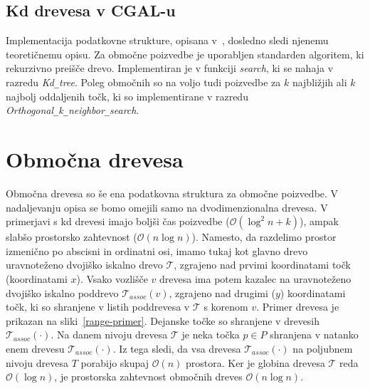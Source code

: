 \documentclass[a4paper, 12pt]{book}
\newcommand{\T}{\ensuremath{\mathcal{T}}}
\newcommand{\OO}{\ensuremath{\mathcal{O}}} %
\newcommand{\U}{\texttt{\_}}
\begin{document}
\subsection{Kd drevesa v CGAL-u}
Implementacija podatkovne strukture, opisana v~\cite{cgal:tf-ssd-15a}, dosledno sledi njenemu teoretičnemu opisu. Za območne poizvedbe je uporabljen standarden algoritem, ki rekurzivno preišče drevo. Implementiran je v funkciji \textit{search}, ki se nahaja v razredu \textit{Kd\U tree}. Poleg območnih so na voljo tudi poizvedbe za $k$ najbližjih ali $k$ najbolj oddaljenih točk, ki so implementirane v razredu \textit{Ortho\-go\-nal\U k\U neigh\-bor\U search}. 

\section{Območna drevesa}
Območna drevesa so še ena podatkovna struktura za območne poizvedbe. V nadaljevanju opisa se bomo omejili samo na dvodimenzionalna drevesa. V primerjavi s kd drevesi imajo boljši čas poizvedbe ($\OO(\log^2 n + k)$), ampak slabšo prostorsko zahtevnost ($\OO(n\log n)$). Namesto, da razdelimo prostor izmenično po abscisni in ordinatni osi, imamo tukaj kot glavno drevo uravnoteženo dvojiško iskalno drevo $\T$, zgrajeno nad prvimi koordinatami točk (koordinatami $x$). Vsako vozlišče $v$ drevesa ima potem kazalec na uravnoteženo dvojiško iskalno poddrevo $\T_{assoc}(v)$, zgrajeno nad drugimi ($y$) koordinatami točk, ki so shranjene v listih poddrevesa v $\T$ s korenom $v$. Primer drevesa je prikazan na sliki~\ref{range-primer}.
Dejanske točke so shranjene v drevesih $\T_{assoc}(\cdot)$. Na danem nivoju drevesa $\T$ je neka točka $p \in P$ shranjena v natanko enem drevesu $\T_{assoc}(\cdot)$. Iz tega sledi, da vsa drevesa $\T_{assoc}(\cdot)$ na poljubnem nivoju drevesa $T$ porabijo skupaj $\OO(n)$ prostora. Ker je globina drevesa $\T$ reda $\OO(\log n)$, je prostorska zahtevnost območnih dreves $\OO(n\log n)$.
\end{document}
